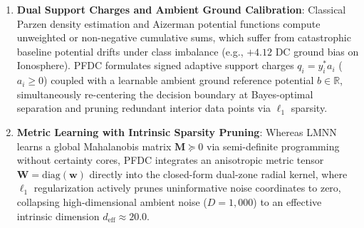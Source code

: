 \documentclass[preprint,review,12pt]{elsarticle}
\begin{document}
\begin{enumerate}
    \item \textbf{Dual Support Charges and Ambient Ground Calibration}: Classical Parzen density estimation and Aizerman potential functions compute unweighted or non-negative cumulative sums, which suffer from catastrophic baseline potential drifts under class imbalance (e.g., $+4.12$ DC ground bias on Ionosphere). PFDC formulates signed adaptive support charges $q_i = y_i^* a_i$ ($a_i \ge 0$) coupled with a learnable ambient ground reference potential $b \in \mathbb{R}$, simultaneously re-centering the decision boundary at Bayes-optimal separation and pruning redundant interior data points via $\ell_1$ sparsity.
    \item \textbf{Metric Learning with Intrinsic Sparsity Pruning}: Whereas LMNN \cite{weinberger2009distance} learns a global Mahalanobis matrix $\mathbf{M} \succeq 0$ via semi-definite programming without certainty cores, PFDC integrates an anisotropic metric tensor $\mathbf{W} = \mathrm{diag}(\mathbf{w})$ directly into the closed-form dual-zone radial kernel, where $\ell_1$ regularization actively prunes uninformative noise coordinates to zero, collapsing high-dimensional ambient noise ($D=1,000$) to an effective intrinsic dimension $d_{\mathrm{eff}} \approx 20.0$.
\end{enumerate}
\end{document}

